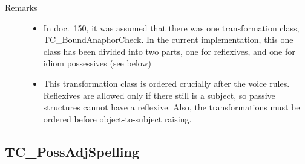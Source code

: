 \begin{description}
\vspace{1 cm}
\item[Remarks] \mbox{}
  \begin{itemize}
  \item In doc.\ 150, it was assumed that there was one transformation class, 
TC\_BoundAnaphorCheck. In the current implementation, this one class has been 
divided into two parts, one for reflexives, and one for idiom possessives (see 
below)
  \item This transformation class is ordered crucially after the voice rules. 
Reflexives are allowed only if there still is a subject, so passive structures 
cannot have a reflexive. Also, the transformations must be ordered before 
object-to-subject raising.
  \end{itemize}
\end{description}

\newpage
\subsection{TC\_PossAdjSpelling}

